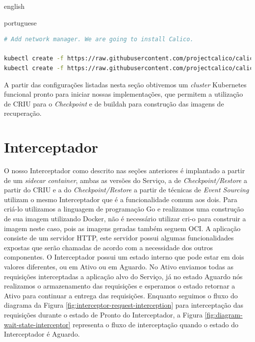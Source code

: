 \begin{otherlanguage*}{english}
\begin{otherlanguage*}{portuguese}
\begin{lstlisting}[language=bash,caption={Inicialização do Kubernetes, configuração de acesso para o kubectl e instalação do administrador de rede para Pods Calico.},label={listing:kubernetes-conf}]
# Add network manager. We are going to install Calico.

kubectl create -f https://raw.githubusercontent.com/projectcalico/calico/v3.26.1/manifests/tigera-operator.yaml
kubectl create -f https://raw.githubusercontent.com/projectcalico/calico/v3.26.1/manifests/custom-resources.yaml
\end{lstlisting}

A partir das configurações listadas nesta seção obtivemos um \textit{cluster} Kubernetes funcional
pronto para iniciar nossas implementações, que permitem a utilização de CRIU para o \textit{Checkpoint}
e de buildah para construção das imagens de recuperação.

\section{Interceptador}

O nosso Interceptador como descrito nas seções anteriores é implantado a partir de um
\textit{sidecar container}, ambas as versões do Serviço, a de \textit{Checkpoint/Restore}
a partir do CRIU e a do \textit{Checkpoint/Restore} a partir de técnicas de
\textit{Event Sourcing} utilizam o mesmo Interceptador que é a funcionalidade comum aos
dois. Para criá-lo utilizamos a linguagem de programação Go e
realizamos uma construção de sua imagem utilizando Docker, não é necessário utilizar
cri-o para construir a imagem neste caso, pois as imagens geradas também seguem OCI.
A aplicação consiste de um servidor HTTP, este servidor possui algumas funcionalidades
expostas que serão chamadas de acordo com a necessidade dos outros componentes.
O Interceptador possui um estado interno que pode estar em dois valores diferentes,
ou em Ativo ou em Aguardo. No Ativo enviamos todas as requisições interceptadas a
aplicação alvo do Serviço, já no estado Aguardo nós realizamos o armazenamento das
requisições e esperamos o estado retornar a Ativo para continuar a entrega das
requisições. Enquanto seguimos o fluxo do diagrama da Figura
\ref{fig:interceptor-request-interception} para interceptação das requisições durante
o estado de Pronto do Interceptador, a Figura \ref{fig:diagram-wait-state-interceptor}
representa o fluxo de interceptação quando o estado do Interceptador é Aguardo.


\end{otherlanguage*}
\end{otherlanguage*}
